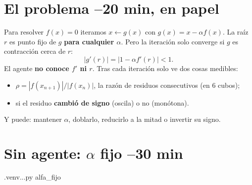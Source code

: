 \section{El problema \hfill\small{}–20 min, en papel}

Para resolver $f(x)=0$ iteramos $x \leftarrow g(x)$ con $g(x) = x - \alpha f(x)$. La raíz $r$ es punto fijo de $g$ \textbf{para cualquier $\alpha$}. Pero la iteración solo converge si $g$ es contracción cerca de $r$:
\[
|g'(r)| = |1 - \alpha f'(r)| < 1 .
\]
El agente \textbf{no conoce $f'$ ni $r$}. Tras cada iteración solo ve dos cosas medibles:
\begin{itemize}
\item $\rho = |f(x_{n+1})| / |f(x_n)|$, la razón de residuos consecutivos (en 6 cubos);
\item si el residuo \textbf{cambió de signo} (oscila) o no (monótona).
\end{itemize}
Y puede: mantener $\alpha$, doblarlo, reducirlo a la mitad o invertir su signo.

\begin{nota}
\begin{preguntas}
\end{preguntas}
\end{nota}

\section[Sin agente: alfa fijo]{Sin agente: $\alpha$ fijo \hfill\small{}–30 min}
\begin{orden}
.venv\Scripts\python ..\docs\curso{}\experimentos.py alfa_fijo
\end{orden}
\begin{preguntas}
\end{preguntas}

